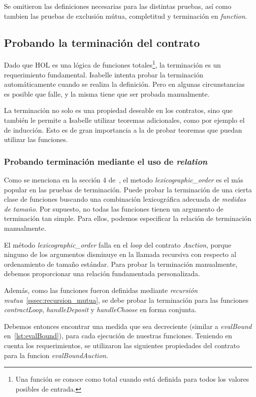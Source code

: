 \documentclass[12pt]{book}
\begin{document}
Se omitieron las definiciones necesarias para las distintas pruebas, así como tambien las pruebas de exclusión mútua, completitud y terminación en \textit{function}.

\subsection{Probando la terminación del contrato}

Dado que HOL es una lógica de funciones totales\footnote{Una función se conoce como total cuando está definida para todos los valores posibles de entrada.}, la terminación es un requerimiento fundamental. Isabelle intenta probar la terminación automáticamente cuando se realiza la definición. Pero en algunas circunstancias es posible que falle, y la misma tiene que ser probada manualmente.

La terminación no solo es una propiedad deseable en los contratos, sino que también le permite a Isabelle utilizar teoremas adicionales, como por ejemplo el de inducción. Esto es de gran importancia a la de probar teoremas que puedan utilizar las funciones.

\subsubsection{Probando terminación mediante el uso de \textit{relation}}

Como se menciona en la sección 4 de~\cite{termination-isabelle}, el metodo \textit{lexicographic\_order} es el más popular en las pruebas de terminación. Puede probar la terminación de una cierta clase de funciones buscando una combinación lexicográfica adecuada de \textit{medidas de tamaño}. Por supuesto, no todas las funciones tienen un argumento de terminación tan simple. Para ellos, podemos especificar la relación de terminación manualmente.

El método \textit{lexicographic\_order} falla en el \textit{loop} del contrato \textit{Auction}, porque ninguno de los argumentos disminuye en la llamada recursiva con respecto al ordenamiento de tamaño estándar. Para probar la terminación manualmente, debemos proporcionar una relación fundamentada personalizada.

Además, como las funciones fueron definidas mediante \textit{recursión mutua}~\ref{sssec:recursion_mutua}, se debe probar la terminación para las funciones \textit{contractLoop}, \textit{handleDeposit} y \textit{handleChoose} en forma conjunta.

Debemos entonces encontrar una medida que sea decreciente (similar a \textit{evalBound} en~\ref{lst:evalBound}), para cada ejecución de nuestras funciones. Teniendo en cuenta los requerimientos, se utilizaron las siguientes propiedades del contrato para la funcion \textit{evalBoundAuction}.
\end{document}
